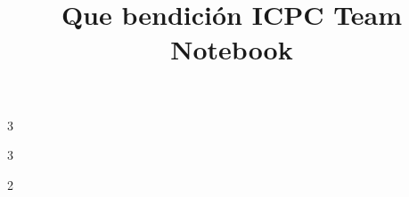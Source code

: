 \documentclass[8pt]{article}
\title{\vspace{-4ex}\Large{Que bendición ICPC Team Notebook}}
\author{}
\date{}
\begin{document}
\pagestyle{fancy}
\setlength{\columnseprule}{0.4pt}
\setlength{\columnsep}{10pt}
\begin{multicols}{3}
\maketitle
\vspace{-13ex}
\tableofcontents
\end{multicols}

\setlength{\columnsep}{10pt}
\begin{multicols}{3}

\end{multicols}

\setlength{\columnseprule}{0pt}
\setlength{\columnsep}{10pt}
\begin{multicols}{2}
{\fontsize{8.4}{6.3}\selectfont

}
\end{multicols}

\pagebreak
\end{document}
